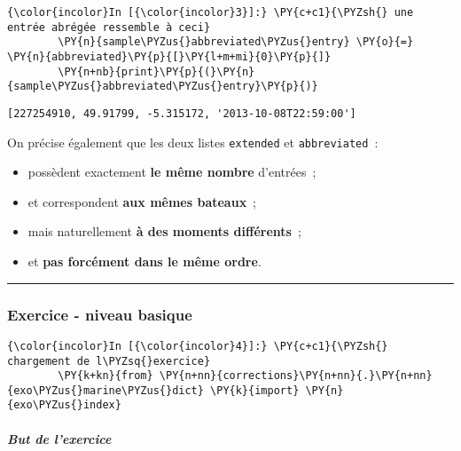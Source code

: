     \begin{Verbatim}[commandchars=\\\{\}]
{\color{incolor}In [{\color{incolor}3}]:} \PY{c+c1}{\PYZsh{} une entrée abrégée ressemble à ceci}
        \PY{n}{sample\PYZus{}abbreviated\PYZus{}entry} \PY{o}{=} \PY{n}{abbreviated}\PY{p}{[}\PY{l+m+mi}{0}\PY{p}{]}
        \PY{n+nb}{print}\PY{p}{(}\PY{n}{sample\PYZus{}abbreviated\PYZus{}entry}\PY{p}{)}
\end{Verbatim}


    \begin{Verbatim}[commandchars=\\\{\}]
[227254910, 49.91799, -5.315172, '2013-10-08T22:59:00']

    \end{Verbatim}

    On précise également que les deux listes \texttt{extended} et
\texttt{abbreviated}~:

\begin{itemize}
\tightlist
\item
  possèdent exactement \textbf{le même nombre} d'entrées~;
\item
  et correspondent \textbf{aux mêmes bateaux}~;
\item
  mais naturellement \textbf{à des moments différents}~;
\item
  et \textbf{pas forcément dans le même ordre}.
\end{itemize}

    \begin{center}\rule{0.5\linewidth}{\linethickness}\end{center}

    \hypertarget{exercice---niveau-basique}{%
\subsubsection{Exercice - niveau
basique}\label{exercice---niveau-basique}}

    \begin{Verbatim}[commandchars=\\\{\}]
{\color{incolor}In [{\color{incolor}4}]:} \PY{c+c1}{\PYZsh{} chargement de l\PYZsq{}exercice}
        \PY{k+kn}{from} \PY{n+nn}{corrections}\PY{n+nn}{.}\PY{n+nn}{exo\PYZus{}marine\PYZus{}dict} \PY{k}{import} \PY{n}{exo\PYZus{}index}
\end{Verbatim}


    \hypertarget{but-de-lexercice}{%
\subparagraph{But de l'exercice}\label{but-de-lexercice}}

